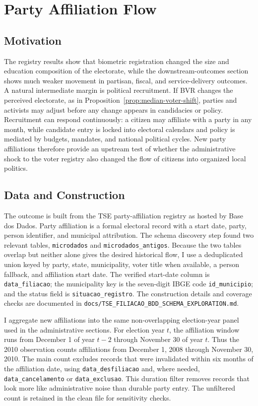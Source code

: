 \section{Party Affiliation Flow}
\label{sec:filiacao-flow}

\subsection{Motivation}

The registry results show that biometric registration changed the size and education composition of the electorate, while the downstream-outcomes section shows much weaker movement in partisan, fiscal, and service-delivery outcomes. A natural intermediate margin is political recruitment. If BVR changes the perceived electorate, as in Proposition~\ref{prop:median-voter-shift}, parties and activists may adjust before any change appears in candidacies or policy. Recruitment can respond continuously: a citizen may affiliate with a party in any month, while candidate entry is locked into electoral calendars and policy is mediated by budgets, mandates, and national political cycles. New party affiliations therefore provide an upstream test of whether the administrative shock to the voter registry also changed the flow of citizens into organized local politics.

\subsection{Data and Construction}

The outcome is built from the TSE party-affiliation registry as hosted by Base dos Dados. Party affiliation is a formal electoral record with a start date, party, person identifier, and municipal attribution. The schema discovery step found two relevant tables, \texttt{microdados} and \texttt{microdados\_antigos}. Because the two tables overlap but neither alone gives the desired historical flow, I use a deduplicated union keyed by party, state, municipality, voter title when available, a person fallback, and affiliation start date. The verified start-date column is \texttt{data\_filiacao}; the municipality key is the seven-digit IBGE code \texttt{id\_municipio}; and the status field is \texttt{situacao\_registro}. The construction details and coverage checks are documented in \texttt{docs/TSE\_FILIACAO\_BDD\_SCHEMA\_EXPLORATION.md}.

I aggregate new affiliations into the same non-overlapping election-year panel used in the administrative sections. For election year $t$, the affiliation window runs from December 1 of year $t-2$ through November 30 of year $t$. Thus the 2010 observation counts affiliations from December 1, 2008 through November 30, 2010. The main count excludes records that were invalidated within six months of the affiliation date, using \texttt{data\_desfiliacao} and, where needed, \texttt{data\_cancelamento} or \texttt{data\_exclusao}. This duration filter removes records that look more like administrative noise than durable party entry. The unfiltered count is retained in the clean file for sensitivity checks.

